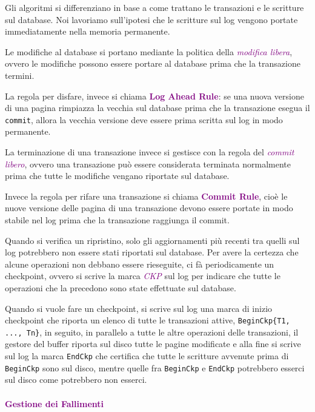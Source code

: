 Gli algoritmi si differenziano in base a come trattano le transazioni e le scritture sul database.
Noi lavoriamo sull'ipotesi che le scritture sul log vengono portate immediatamente nella
memoria permanente.

Le modifiche al database si portano mediante la politica della \emph{\textcolor{purple}{modifica libera}},
ovvero le modifiche possono essere portare al database prima che la transazione termini.

La regola per disfare, invece si chiama \textbf{\textcolor{purple}{Log Ahead Rule}}:
se una nuova versione di una pagina rimpiazza la vecchia sul database prima
che la transazione esegua il \verb|commit|, allora la vecchia versione deve essere
prima scritta sul log in modo permanente.

La terminazione di una transazione invece si gestisce con la regola del \emph{\textcolor{purple}{commit libero}},
ovvero una transazione può essere considerata terminata normalmente prima che tutte le modifiche
vengano riportate sul database.

Invece la regola per rifare una transazione si chiama \textbf{\textcolor{purple}{Commit Rule}},
cioè le nuove versione delle pagina di una transazione devono essere portate in modo
stabile nel log prima che la transazione raggiunga il commit.

Quando si verifica un ripristino, solo gli aggiornamenti più recenti
tra quelli sul log potrebbero non essere stati riportati sul database.
Per avere la certezza che alcune operazioni non debbano essere rieseguite,
ci fà periodicamente un checkpoint, ovvero si scrive la marca \emph{\textcolor{purple}{CKP}}
sul log per indicare che tutte le operazioni che la precedono sono state effettuate sul database.

Quando si vuole fare un checkpoint, si scrive sul log una marca di inizio
checkpoint che riporta un elenco di tutte le transazioni attive,
\verb|BeginCkp{T1, ..., Tn}|, in seguito, in parallelo a tutte le altre
operazioni delle transazioni, il gestore del buffer riporta sul disco
tutte le pagine modificate e alla fine si scrive sul log la marca \verb|EndCkp|
che certifica che tutte le scritture avvenute prima di \verb|BeginCkp| sono sul disco,
mentre quelle fra \verb|BeginCkp| e \verb|EndCkp| potrebbero esserci sul disco come potrebbero
non esserci.

\paragraph{\textcolor{purple}{Gestione dei Fallimenti}}

